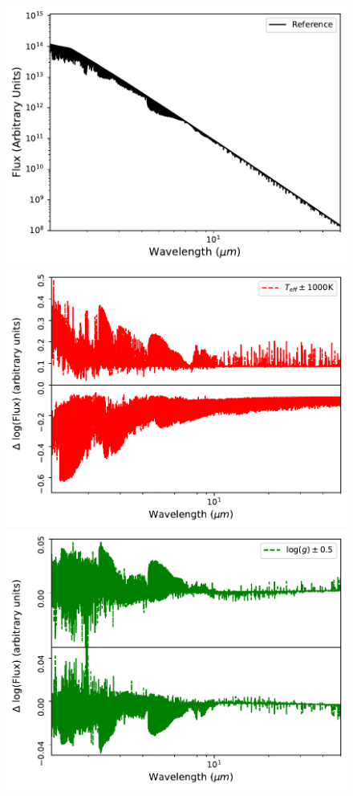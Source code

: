\documentclass{aa}
\begin{document}
\begin{figure}
\includegraphics[width=0.85\columnwidth]{figs/gaia/reference.pdf}
\includegraphics[width=0.85\columnwidth]{figs/gaia/t_depends.pdf}
\includegraphics[width=0.85\columnwidth]{figs/gaia/g_depends.pdf}

\end{figure}
\end{document}
